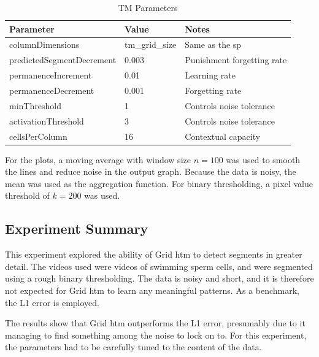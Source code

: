 \begin{table}[H]
    \centering
    \begin{tabularx}{\linewidth}{@{}XlX@{}}
        \toprule
        \textbf{Parameter}        & \textbf{Value} & \textbf{Notes}             \\
        \midrule
        columnDimensions          & tm\_grid\_size & Same as the \gls*{sp}      \\
        predictedSegmentDecrement & 0.003          & Punishment forgetting rate \\
        permanenceIncrement       & 0.01           & Learning rate              \\
        permanenceDecrement       & 0.001          & Forgetting rate            \\
        minThreshold              & 1              & Controls noise tolerance   \\
        activationThreshold       & 3              & Controls noise tolerance   \\
        cellsPerColumn            & 16             & Contextual capacity        \\
        \bottomrule
    \end{tabularx}
    \caption{TM Parameters}
    \label{tab:sperm_tm_param}
\end{table}
For the plots, a moving average with window size $n=100$ was used to smooth the lines and reduce noise in the output graph. Because the data is noisy, the mean was used as the aggregation function. For binary thresholding, a pixel value threshold of $k=200$ was used.
\subsection{Experiment Summary}
This experiment explored the ability of Grid \gls*{htm} to detect segments in greater detail. The videos used were videos of swimming sperm cells, and were segmented using a rough binary thresholding. The data is noisy and short, and it is therefore not expected for Grid \gls*{htm} to learn any meaningful patterns. As a benchmark, the L1 error is employed.
\par
The results show that Grid \gls*{htm} outperforms the L1 error, presumably due to it managing to find something among the noise to lock on to. For this experiment, the parameters had to be carefully tuned to the content of the data.
\clearpage
